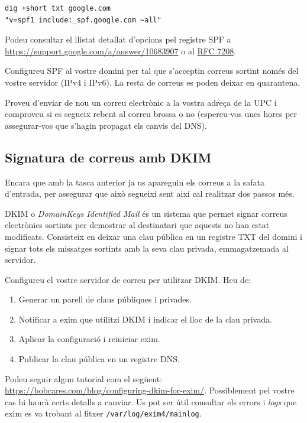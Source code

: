 \documentclass{practicaitic}
\begin{document}
\begin{verbatim}
dig +short txt google.com
"v=spf1 include:_spf.google.com ~all"
\end{verbatim}

Podeu consultar el llistat detallat d'opcions pel registre SPF a
\url{https://support.google.com/a/answer/10683907} o al
\href{https://datatracker.ietf.org/doc/html/rfc7208}{RFC 7208}.

\begin{tasca}
  Configureu SPF al vostre domini per tal que s'acceptin correus sortint només
  del vostre servidor (IPv4 i IPv6). La resta de correus es poden deixar en
  quarantena.

  Proveu d'enviar de nou un correu electrònic a la vostra adreça de la UPC
  i comproveu si es segueix rebent al correu brossa o no (espereu-vos unes hores
  per assegurar-vos que s'hagin propagat els canvis del DNS).
\end{tasca}

\subsection{Signatura de correus amb DKIM}

Encara que amb la tasca anterior ja us apareguin els correus a la safata
d'entrada, per assegurar que això segueixi sent així cal realitzar dos passos
més.

DKIM o \textit{DomainKeys Identified Mail} és un sistema que permet signar
correus electrònics sortints per demostrar al destinatari que aquests no han
estat modificats.
Consisteix en deixar una clau pública en un registre TXT del domini i signar
tots els missatges sortints amb la seva clau privada, emmagatzemada al servidor.

\begin{tasca}
  Configureu el vostre servidor de correu per utilitzar DKIM. Heu de:
  \begin{enumerate}
    \item Generar un parell de claus públiques i privades.
    \item Notificar a exim que utilitzi DKIM i indicar el lloc de la clau privada.
    \item Aplicar la configuració i reiniciar exim.
    \item Publicar la clau pública en un registre DNS.
  \end{enumerate}
\end{tasca}

Podeu seguir algun tutorial com el següent:
\url{https://bobcares.com/blog/configuring-dkim-for-exim/}. Possiblement
pel vostre cas hi haurà certs detalls a canviar. Us pot ser útil
consultar els errors i \textit{logs} que exim es va trobant al fitxer
\texttt{/var/log/exim4/mainlog}.
\end{document}
